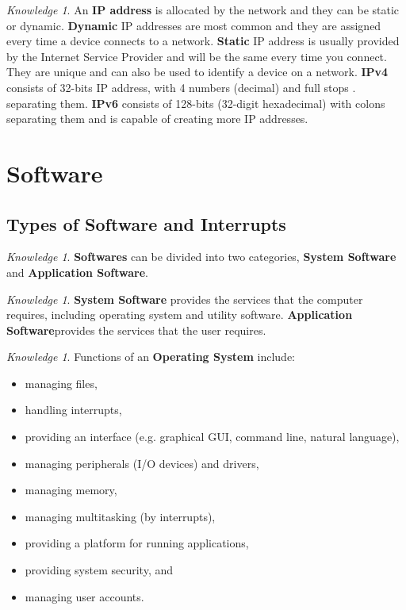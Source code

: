 \documentclass[8pt]{article}
\theoremstyle{remark}
\newtheorem{knowledge}[method]{Knowledge}
\begin{document}
            \begin{knowledge}
                An \textbf{IP address} is allocated by the network and they can be static or dynamic. \textbf{Dynamic} IP addresses are most common and they are assigned every time a device connects to a network. \textbf{Static} IP address is usually provided by the Internet Service Provider and will be the same every time you connect. They are unique and can also be used to identify a device on a network. \textbf{IPv4} consists of 32-bits IP address, with 4 numbers (decimal) and full stops . separating them. \textbf{IPv6} consists of 128-bits (32-digit hexadecimal) with colons separating them and is capable of creating more IP addresses.
            \end{knowledge}
    
    \section{Software}

        \subsection{Types of Software and Interrupts}
            \begin{knowledge}
                \textbf{Softwares} can be divided into two categories, \textbf{System Software} and \textbf{Application Software}.
            \end{knowledge}

            \begin{knowledge}
                \textbf{System Software} provides the services that the computer requires, including operating system and utility software. \textbf{Application Software}provides the services that the user requires.
            \end{knowledge}

            \begin{knowledge}
                Functions of an \textbf{Operating System} include:
                \begin{itemize}
                    \item managing files,
                    \item handling interrupts,
                    \item providing an interface (e.g. graphical GUI, command line, natural language),
                    \item managing peripherals (I/O devices) and drivers,
                    \item managing memory,
                    \item managing multitasking (by interrupts),
                    \item providing a platform for running applications,
                    \item providing system security, and
                    \item managing user accounts.
                \end{itemize}
            \end{knowledge}
\end{document}
